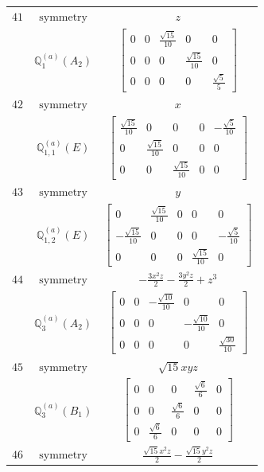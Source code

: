 \documentclass[fleqn,8pt,landscape]{jsarticle}
\begin{document}
\begin{longtable}{ccc}
$ 41 $ & $ \text{symmetry} $ & $ z $ \\
$  $ & $ \mathbb{Q}_{1}^{(a)}(A_{2}) $ & $ \begin{bmatrix} 0 & 0 & \frac{\sqrt{15}}{10} & 0 & 0 \\ 0 & 0 & 0 & \frac{\sqrt{15}}{10} & 0 \\ 0 & 0 & 0 & 0 & \frac{\sqrt{5}}{5} \end{bmatrix} $ \\ \hline
$ 42 $ & $ \text{symmetry} $ & $ x $ \\
$  $ & $ \mathbb{Q}_{1,1}^{(a)}(E) $ & $ \begin{bmatrix} \frac{\sqrt{15}}{10} & 0 & 0 & 0 & - \frac{\sqrt{5}}{10} \\ 0 & \frac{\sqrt{15}}{10} & 0 & 0 & 0 \\ 0 & 0 & \frac{\sqrt{15}}{10} & 0 & 0 \end{bmatrix} $ \\ \hline
$ 43 $ & $ \text{symmetry} $ & $ y $ \\
$  $ & $ \mathbb{Q}_{1,2}^{(a)}(E) $ & $ \begin{bmatrix} 0 & \frac{\sqrt{15}}{10} & 0 & 0 & 0 \\ - \frac{\sqrt{15}}{10} & 0 & 0 & 0 & - \frac{\sqrt{5}}{10} \\ 0 & 0 & 0 & \frac{\sqrt{15}}{10} & 0 \end{bmatrix} $ \\ \hline
$ 44 $ & $ \text{symmetry} $ & $ - \frac{3 x^{2} z}{2} - \frac{3 y^{2} z}{2} + z^{3} $ \\
$  $ & $ \mathbb{Q}_{3}^{(a)}(A_{2}) $ & $ \begin{bmatrix} 0 & 0 & - \frac{\sqrt{10}}{10} & 0 & 0 \\ 0 & 0 & 0 & - \frac{\sqrt{10}}{10} & 0 \\ 0 & 0 & 0 & 0 & \frac{\sqrt{30}}{10} \end{bmatrix} $ \\ \hline
$ 45 $ & $ \text{symmetry} $ & $ \sqrt{15} x y z $ \\
$  $ & $ \mathbb{Q}_{3}^{(a)}(B_{1}) $ & $ \begin{bmatrix} 0 & 0 & 0 & \frac{\sqrt{6}}{6} & 0 \\ 0 & 0 & \frac{\sqrt{6}}{6} & 0 & 0 \\ 0 & \frac{\sqrt{6}}{6} & 0 & 0 & 0 \end{bmatrix} $ \\ \hline
$ 46 $ & $ \text{symmetry} $ & $ \frac{\sqrt{15} x^{2} z}{2} - \frac{\sqrt{15} y^{2} z}{2} $ \\

\end{longtable}
\end{document}
